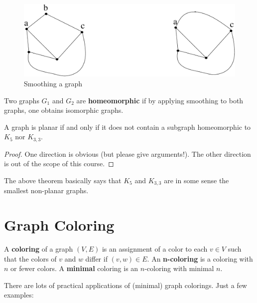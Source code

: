 \begin{figure}[ht]
	\centering
	\includegraphics[width=0.4\linewidth,keepaspectratio]{rij1}
	\caption{Smoothing a graph \label{rij1}}
\end{figure}

\begin{definition}
  \textup{Two graphs $G_{1}$ and $G_{2}$ are \textbf{homeomorphic} if
by applying smoothing to both graphs, one obtains isomorphic graphs.}
\end{definition}

 \begin{theorem}
A graph is planar if and only if it does not contain a subgraph
homeomorphic to $K_{5}$ nor $K_{3,3}$.
\end{theorem}
\begin{proof}
One direction is obvious (but please give arguments!). The other direction
is out of the scope of this course.
\end{proof}

The above theorem basically says that $K_{5}$ and $K_{3,3}$ are in
some sense the smallest non-planar graphs.


\section{Graph Coloring}

 \begin{definition}
\textup{A \textbf{coloring} of a graph $(V,E)$ is an assignment of a
  color to each $v \in V$ such that the colors of $v$ and $w$ differ
  if $(v,w) \in E$. An
  \mbox{\textbf{n-coloring}} is a coloring with $n$ or fewer
  colors. A \textbf{minimal} coloring is an $n$-coloring
  with minimal $n$.}
\end{definition}

There are lots of practical applications of (minimal) graph colorings.
Just a few examples:

